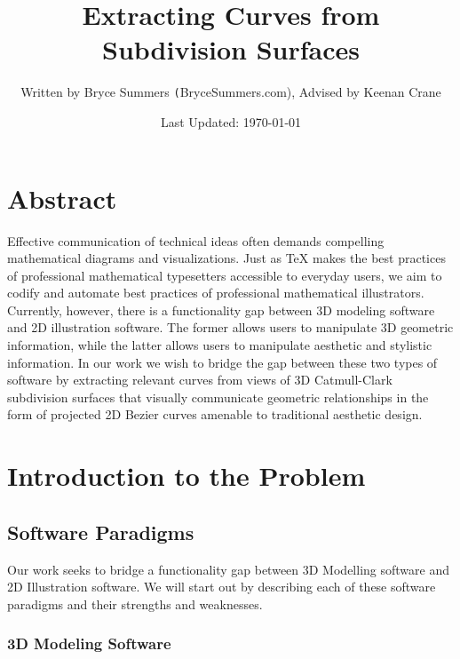 \documentclass[12pt, letterpaper]{article}
\begin{document}
\title{\color{blue}Extracting Curves from Subdivision Surfaces}
\author{Written by Bryce Summers \texttt(BryceSummers.com), Advised by Keenan Crane}
\date{\color{red}Last Updated: \today}
\maketitle

\newpage

\tableofcontents
\newpage

\section{Abstract}

	Effective communication of technical ideas often demands compelling mathematical diagrams and visualizations. 
	Just as TeX makes the best practices of professional mathematical typesetters accessible to everyday users,
	we aim to codify and automate best practices of professional mathematical illustrators.
	Currently, however, there is a functionality gap between 3D modeling software and 2D illustration software.
	The former allows users to manipulate 3D geometric information, while the latter allows users to manipulate aesthetic and stylistic information.
	In our work we wish to bridge the gap between these two types of software by extracting relevant curves from views of 3D Catmull-Clark subdivision 
		surfaces that visually communicate geometric relationships in the form of projected 2D Bezier curves amenable to traditional aesthetic design.


\newpage

\section{Introduction to the Problem}

	\subsection{Software Paradigms}

		Our work seeks to bridge a functionality gap between 3D Modelling software and 2D Illustration software. We will start out by describing each of these
		software paradigms and their strengths and weaknesses.

		\subsubsection{3D Modeling Software}
\end{document}
